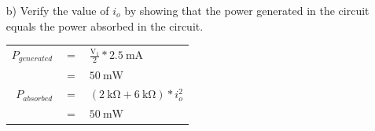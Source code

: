 \documentclass[a4paper]{article}
\begin{document}
\begin{itemize}
\begin{itemize}
\begin{tabular}{r c l}
	      	      \end{tabular}  
	      	\item[b)] Verify the value of $i_{o}$ by showing that the power generated in the circuit equals the power absorbed in the circuit. \\
	      	      \begin{tabular}{r c l}
	      	      	$P_{generated}$ & $=$ & $\frac{\si{\volt}_{1}}{2} * \SI{2.5}{\milli\ampere}$ \\
	      	      	                & $=$ & $\SI{50}{\milli\watt}$                               \\
	      	      	$P_{absorbed}$  & $=$ & $(\SI{2}{\kilo\ohm} + \SI{6}{\kilo\ohm}) * i_{o}^2$  \\		
	      	      	                & $=$ & $\SI{50}{\milli\watt}$                               \\
	      	      \end{tabular} 
	      \end{itemize}  
\end{itemize}

  
\end{document}
